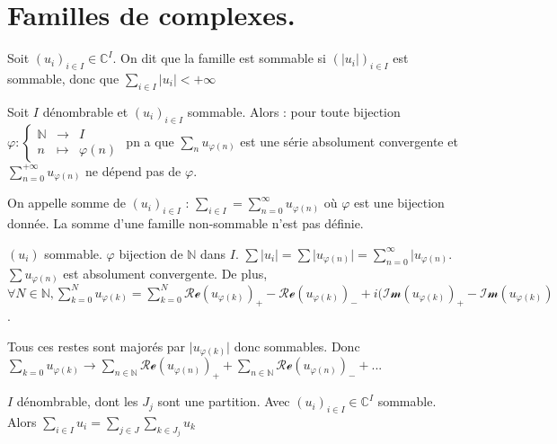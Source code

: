 \documentclass[a4paper,12pt]{book}
\newcommand{\Def}[2]{\begin{tcolorbox}[sharp corners, colback=white,colframe=blue!90!black!75, title=Définition : #1]#2\end{tcolorbox}}
\newcommand{\Thr}[2]{\begin{tcolorbox}[sharp corners, colback=white,colframe=red!90!black!75, title=Théorème : #1]#2\end{tcolorbox}}
\newcommand{\Prop}[2]{\begin{tcolorbox}[sharp corners, colback=white,colframe=red!90!black!75, title=Proposition : #1]#2\end{tcolorbox}}
\newcommand{\Pre}[1]{\begin{tcolorbox}[sharp corners, colback=white,colframe=green!60!green!30!black!75, title=Preuve]#1\end{tcolorbox}}
\def\C{\mathbb{C}}
\def\N{\mathbb{N}}
\begin{document}
\section{Familles de complexes.}
\Def{Sommabilité complexe}{Soit $(u_i)_{i\in I}\in\C^I$. On dit que la famille est sommable si $(|u_i|)_{i\in I}$ est sommable, donc que $\sum\limits_{i\in I}|u_i|<+\infty$}
\Prop{Somme d'une famille sommable.}{Soit $I$ dénombrable et $(u_i)_{i\in I}$ sommable. Alors : pour toute bijection $\varphi:\left\{\begin{array}{rcl} \N&\to&I \\ n&\mapsto&\varphi(n)\end{array}\right.$ pn a que $\sum\limits_{n}u_{\varphi(n)}$ est une série absolument convergente et $\sum\limits_{n=0}^{+\infty}u_{\varphi(n)}$ ne dépend pas de $\varphi$.
\par On appelle somme de $(u_i)_{i\in I}$ : $\sum\limits_{i\in I} =\sum\limits_{n=0}^\infty u_{\varphi(n)}$ où $\varphi$ est une bijection donnée. La somme d'une famille non-sommable n'est pas définie.}
\Pre{$(u_i)$ sommable. $\varphi$ bijection de $\N$ dans $I$. $\sum \vert u_i\vert = \sum \vert u_{\varphi(n)}\vert = \sum\limits_{n=0}^\infty\vert u_{\varphi(n)}$. $\sum u_{\varphi(n)}$ est absolument convergente. De plus, $\forall N\in\N, \sum\limits_{k=0}^N u_{\varphi(k)} = \sum\limits_{k=0}^N\mathcal{Re}(u_{\varphi(k)})_+ - \mathcal{Re}(u_{\varphi(k)})_- + i(\mathcal{Im}(u_{\varphi(k)})_+ - \mathcal{Im}(u_{\varphi(k)})$.
\par Tous ces restes sont majorés par $\vert u_{\varphi(k)}\vert$ donc sommables. Donc $\sum\limits_{k=0}u_{\varphi(k)}\to \sum\limits_{n\in\N} \mathcal{Re}(u_{\varphi(n)})_+ + \sum\limits_{n\in\N} \mathcal{Re}(u_{\varphi(n)})_-+...$}
\Thr{Sommation par paquets}{$I$ dénombrable, dont les $J_j$ sont une partition. Avec $(u_i)_{i\in I}\in\C^I$ sommable. Alors $\sum\limits_{i\in I}u_i = \sum\limits_{j\in J}\sum\limits_{k\in J_j} u_k$}
\end{document}
